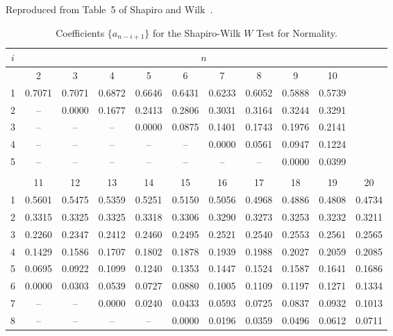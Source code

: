 \documentclass[draft]{article}
\begin{document}
\begin{table}
\caption{Coefficients \(\{a_{n-i+1}\}\) for the Shapiro-Wilk
\(W\) Test for Normality.}
\centerline{Reproduced from Table~5 of Shapiro and Wilk~\cite{shapiro65}.}
\label{tbl:shapiro-wilk-a}
\tiny
\begin{center}
\begin{tabular}{rcccccccccc}\hline
\multicolumn{1}{c}{\(i\)}  & \multicolumn{10}{c}{\(n\)} \\ \hline
  & \multicolumn{1}{c}{2}
  & \multicolumn{1}{c}{3}
  & \multicolumn{1}{c}{4}
  & \multicolumn{1}{c}{5}
  & \multicolumn{1}{c}{6}
  & \multicolumn{1}{c}{7}
  & \multicolumn{1}{c}{8}
  & \multicolumn{1}{c}{9}
  & \multicolumn{1}{c}{10} \\ \cline{2-10}
 1&0.7071&0.7071&0.6872&0.6646&0.6431&0.6233&0.6052&0.5888&0.5739\\
 2&    --&0.0000&0.1677&0.2413&0.2806&0.3031&0.3164&0.3244&0.3291\\
 3&    --&    --&   -- &0.0000&0.0875&0.1401&0.1743&0.1976&0.2141\\
 4&    --&    --&   -- &   -- &   -- &0.0000&0.0561&0.0947&0.1224\\
 5&    --&    --&   -- &   -- &   -- &   -- &   -- &0.0000&0.0399\\
\\
  & \multicolumn{1}{c}{11}
  & \multicolumn{1}{c}{12}
  & \multicolumn{1}{c}{13}
  & \multicolumn{1}{c}{14}
  & \multicolumn{1}{c}{15}
  & \multicolumn{1}{c}{16}
  & \multicolumn{1}{c}{17}
  & \multicolumn{1}{c}{18}
  & \multicolumn{1}{c}{19}
  & \multicolumn{1}{c}{20} \\ \cline{2-11}
 1&0.5601&0.5475&0.5359&0.5251&0.5150&0.5056&0.4968&0.4886&0.4808&0.4734\\
 2&0.3315&0.3325&0.3325&0.3318&0.3306&0.3290&0.3273&0.3253&0.3232&0.3211\\
 3&0.2260&0.2347&0.2412&0.2460&0.2495&0.2521&0.2540&0.2553&0.2561&0.2565\\
 4&0.1429&0.1586&0.1707&0.1802&0.1878&0.1939&0.1988&0.2027&0.2059&0.2085\\
 5&0.0695&0.0922&0.1099&0.1240&0.1353&0.1447&0.1524&0.1587&0.1641&0.1686\\
 6&0.0000&0.0303&0.0539&0.0727&0.0880&0.1005&0.1109&0.1197&0.1271&0.1334\\
 7&   -- &   -- &0.0000&0.0240&0.0433&0.0593&0.0725&0.0837&0.0932&0.1013\\
 8&   -- &   -- &   -- &   -- &0.0000&0.0196&0.0359&0.0496&0.0612&0.0711\\

\end{tabular}
\end{center}
\end{table}
\end{document}
